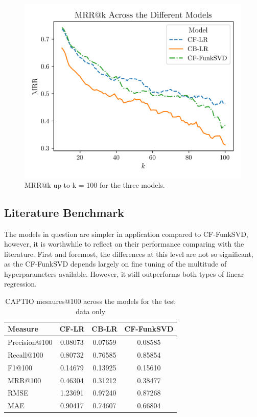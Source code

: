 \documentclass[conference]{IEEEtran}
\begin{document}
\begin{figure}[H]
    \centering
    \includegraphics[width=1\linewidth]{assets/results_mrrK.png}
    \caption{MRR@k up to k = 100 for the three models.}
    \label{fig:results_mrrK}
\end{figure}

\subsection{Literature Benchmark}

The models in question are simpler in application compared to CF-FunkSVD, however, it is worthwhile to reflect on their performance comparing with the literature. First and foremost, the differences at this level are not so significant, as the CF-FunkSVD depends largely on fine tuning of the multitude of hyperparameters available. However, it still outperforms both types of linear regression.

\begin{table}[H]
\centering
\caption{CAPTIO mesaures@100 across the models for the test data only}
\label{tab:atk_results_benchamarkpaper}
\begin{tabular}{lccc}
\toprule
\textbf{Measure} & \textbf{CF-LR} & \textbf{CB-LR} & \textbf{CF-FunkSVD} \\
\midrule
Precision@100 & 0.08073 & 0.07659 & 0.08585 \\
Recall@100 & 0.80732 & 0.76585 & 0.85854 \\
F1@100 & 0.14679 & 0.13925 & 0.15610 \\
MRR@100 & 0.46304 & 0.31212 & 0.38477 \\
RMSE & 1.23691 & 0.97240 & 0.87268 \\
MAE & 0.90417 & 0.74607 & 0.66804 \\
\bottomrule
\end{tabular}
\end{table}
\end{document}
